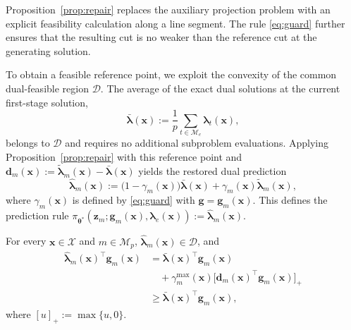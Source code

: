 Proposition~\ref{prop:repair} replaces the auxiliary
projection problem with an explicit feasibility
calculation along a line segment. The rule
\eqref{eq:guard} further ensures that the resulting
cut is no weaker than the reference cut at the
generating solution.

To obtain a feasible reference point, we exploit
the convexity of the common dual-feasible region
$\mathcal D$. The average of the exact dual solutions
at the current first-stage solution,
\begin{equation}\label{eq:mean-anchor}
\bar{\boldsymbol\lambda}(\mathbf x)
:=\frac{1}{p}\sum_{t\in\mathcal M_e}
\boldsymbol\lambda_t(\mathbf x),
\end{equation}
belongs to $\mathcal D$ and requires no additional
subproblem evaluations. Applying
Proposition~\ref{prop:repair} with this reference
point and
$\mathbf d_m(\mathbf x):=
\widetilde{\boldsymbol\lambda}_m(\mathbf x)
-\bar{\boldsymbol\lambda}(\mathbf x)$
yields the restored dual prediction
\begin{equation}\label{eq:certified}
\widehat{\boldsymbol\lambda}_m(\mathbf x)
:=
\bigl(1-\gamma_m(\mathbf x)\bigr)
\bar{\boldsymbol\lambda}(\mathbf x)
+\gamma_m(\mathbf x)
\widetilde{\boldsymbol\lambda}_m(\mathbf x),
\end{equation}
where $\gamma_m(\mathbf x)$ is defined by
\eqref{eq:guard} with
$\mathbf g=\mathbf g_m(\mathbf x)$.
This defines the prediction rule
$\pi_{\boldsymbol\theta^*}
(\mathbf z_m;\mathbf g_m(\mathbf x),
\boldsymbol\lambda_e(\mathbf x))
:=\widehat{\boldsymbol\lambda}_m(\mathbf x)$.

\begin{proposition}
\label{prop:certificate}
For every $\mathbf x\in\mathcal X$ and
$m\in\mathcal M_p$,
$\widehat{\boldsymbol\lambda}_m(\mathbf x)
\in\mathcal D$, and
\begin{equation}\label{eq:improvement}
\begin{aligned}
\widehat{\boldsymbol\lambda}_m(\mathbf x)^\top
\mathbf g_m(\mathbf x)
&=\bar{\boldsymbol\lambda}(\mathbf x)^\top
\mathbf g_m(\mathbf x)\\
&\quad+
\gamma_m^{\max}(\mathbf x)
\bigl[\mathbf d_m(\mathbf x)^\top
\mathbf g_m(\mathbf x)\bigr]_+\\
&\ge
\bar{\boldsymbol\lambda}(\mathbf x)^\top
\mathbf g_m(\mathbf x),
\end{aligned}
\end{equation}
where $[u]_+:=\max\{u,0\}$.
\end{proposition}
